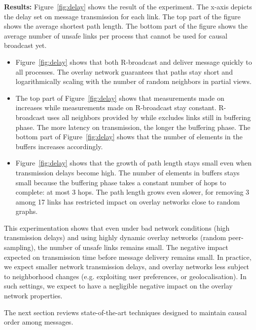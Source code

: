 \noindent \textbf{Results:} Figure~\ref{fig:delay} shows the result of the
experiment. The x-axis depicts the delay set on message transmission for each
link. The top part of the figure shows the average shortest path length. The
bottom part of the figure shows the average number of unsafe links per process
that cannot be used for causal broadcast yet.
\begin{itemize}[leftmargin=*]
\item Figure~\ref{fig:delay} shows that both R-broadcast and \CBROADCAST deliver
  message quickly to all processes. The overlay network guarantees that paths
  stay short and logarithmically scaling with the number of random neighbors in
  partial views.
\item The top part of Figure~\ref{fig:delay} shows that measurements made on
  \CBROADCAST increases while measurements made on R-broadcast stay
  constant. R-broadcast uses all neighbors provided by \SPRAY while \CBROADCAST
  excludes links still in buffering phase. The more latency on transmission, the
  longer the buffering phase. The bottom part of Figure~\ref{fig:delay} shows
  that the number of elements in the buffers increases accordingly.
\item Figure~\ref{fig:delay} shows that the growth of path length stays small
  even when transmission delays become high. The number of elements in buffers
  stays small because the buffering phase takes a constant number of hops to
  complete: at most 3 hops. The path length grows even slower, for removing 3
  among 17 links has restricted impact on overlay networks close to random
  graphs.
\end{itemize}

This experimentation shows that even under bad network conditions (high
transmission delays) and using highly dynamic overlay networks (random
peer-sampling), the number of unsafe links remains small. The negative impact
expected on transmission time before message delivery remains small. In
practice, we expect smaller network transmission delays, and overlay networks
less subject to neighborhood changes (e.g. exploiting user preferences, or
geolocalisation). In such settings, we expect \CBROADCAST to have a negligible
negative impact on the overlay network properties.

The next section reviews state-of-the-art techniques designed to maintain causal
order among messages.

